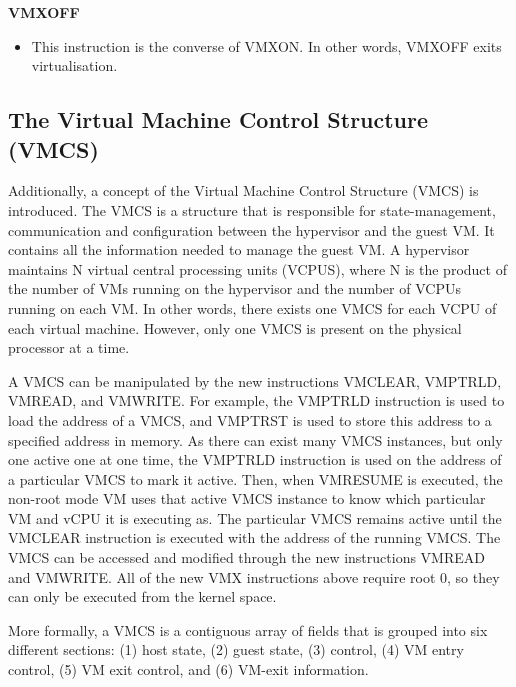 \documentclass{report}
\begin{document}
\begin{spacing}{1.5}
{\textbf{VMXOFF}
\begin{itemize}
\item[] {\large This instruction is the converse of VMXON. In other words, VMXOFF exits virtualisation. }
\end{itemize}

\leavevmode\newline
}



\subsection{The Virtual Machine Control Structure (VMCS)}

{\large
Additionally, a concept of the Virtual Machine Control Structure (VMCS) is introduced. The VMCS is a structure that is responsible for state-management, communication and configuration between the hypervisor and the guest VM. It contains all the information needed to manage the guest VM. A hypervisor maintains N virtual central processing units (VCPUS), where N is the product of the number of VMs running on the hypervisor and the number of VCPUs running on each VM. In other words, there exists one VMCS for each VCPU of each virtual machine. However, only one VMCS is present on the physical processor at a time. 
\newline
}

{\large
A VMCS can be manipulated by the new instructions VMCLEAR, VMPTRLD, VMREAD, and VMWRITE. For example, the VMPTRLD instruction is used to load the address of a VMCS, and VMPTRST is used to store this address to a specified address in memory. As there can exist many VMCS instances, but only one active one at one time, the VMPTRLD instruction is used on the address of a particular VMCS to mark it active. Then, when VMRESUME is executed, the non-root mode VM uses that active VMCS instance to know which particular VM and vCPU it is executing as. The particular VMCS remains active until the VMCLEAR instruction is executed with the address of the running VMCS. The VMCS can be accessed and modified through the new instructions VMREAD and VMWRITE. All of the new VMX instructions above require root 0, so they can only be executed from the kernel space.

More formally, a VMCS is a contiguous array of fields that is grouped into six different sections: (1) host state, (2) guest state, (3) control, (4) VM entry control, (5) VM exit control, and (6) VM-exit information.
\newline
}


\end{spacing}
\end{document}
